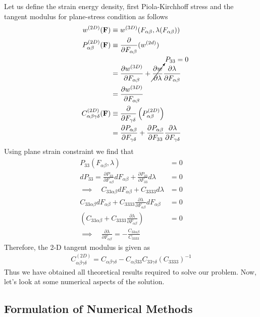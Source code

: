 \documentclass[../main.tex]{subfiles}
\begin{document}
Let us define the strain energy density, first Piola-Kirchhoff stress
and the tangent modulus for plane-stress condition as follows
\begin{align*}
  w^{(2D)}(\mathbf{F}) &\equiv w^{(3D)}(F_{\alpha\beta},\lambda(F_{\alpha\beta}))\\
  P^{(2D)}_{\alpha\beta}(\mathbf{F})&\equiv \frac{\partial}{\partial F_{\alpha\beta}}(w^{(2d)})\\
                       &= \frac{\partial w^{(3D)}}{\partial F_{\alpha\beta}} +\cancelto{P_{33}=0}{\frac{\partial w}{\partial \lambda}}\frac{\partial \lambda}{\partial F_{\alpha\beta}}\\
                       &= \frac{\partial w^{(3D)}}{\partial F_{\alpha\beta}}\\
  C^{(2D)}_{\alpha\beta\gamma\delta}(\mathbf{F})&\equiv \frac{\partial}{\partial F_{\gamma\delta}}\left(P^{(2D)}_{\alpha\beta}\right)\\
                       &=\frac{\partial P_{\alpha\beta}}{\partial F_{\gamma\delta}} + \frac{\partial P_{\alpha\beta}}{\partial F_{33}}\frac{\partial\lambda}{\partial F_{\gamma\delta}}
\end{align*}
Using plane strain constraint we find that
\begin{align*}
  P_{33}(F_{\alpha\beta},\lambda)&=0\\
  dP_{33} = \frac{\partial P_{33}}{\partial F_{\alpha\beta}}dF_{\alpha\beta} + \frac{\partial P_{33}}{\partial F_{33}}d\lambda &= 0\\
  \implies \quad C_{33\alpha\beta}dF_{\alpha\beta}+C_{3333}d\lambda &=0\\
  C_{33\alpha\beta}dF_{\alpha\beta}+C_{3333}\frac{\partial\lambda}{\partial F_{\alpha\beta}}dF_{\alpha\beta} &=0\\
  \left(C_{33\alpha\beta}+C_{3333}\frac{\partial\lambda}{\partial F_{\alpha\beta}}\right) &=0\\
  \implies\quad\boxed{\frac{\partial\lambda}{\partial F_{\alpha\beta}} = -\frac{C_{33\alpha\beta}}{C_{3333}}}
\end{align*}
Therefore, the 2-D tangent modulus is given as
\begin{align*}
  \boxed{C^{(2D)}_{\alpha\beta\gamma\delta} = C_{\alpha\beta\gamma\delta} - C_{\alpha\beta33}C_{33\gamma\delta}\left(C_{3333}\right)^{-1}}
\end{align*}
Thus we have obtained all theoretical results required to solve our
problem. Now, let's look at some numerical aspects of the solution.
\subsection{Formulation of Numerical Methods}
\end{document}
